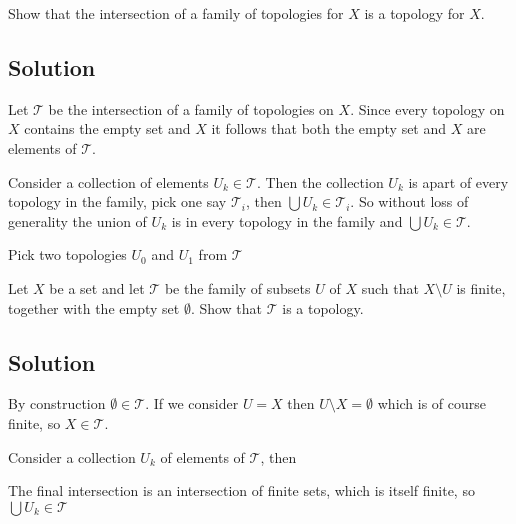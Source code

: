 
Show that the intersection of a family of topologies for $X$ is a topology for $X$.
\subsection*{Solution}
Let $\mathcal{T}$ be the intersection of a family of topologies on $X$. Since every topology on $X$ contains the empty set and $X$ it follows that both the empty set and $X$ are elements of $\mathcal{T}$.

Consider a collection of elements $U_k \in \mathcal{T}$. Then the collection $U_k$ is apart of every topology in the family, pick one say $\mathcal{T}_i$, then $\bigcup U_k \in \mathcal{T}_i$. So without loss of generality the union of $U_k$ is in every topology in the family and $\bigcup U_k \in \mathcal{T}$.

Pick two topologies $U_0$ and $U_1$ from $\mathcal{T}$

\pagebreak
{}
Let $X$ be a set and let $\mathcal{T}$ be the family of subsets $U$ of $X$ such that $X \setminus U$ is finite, together with the empty set $\emptyset$. Show that $\mathcal{T}$ is a topology.

\subsection*{Solution}
By construction $\emptyset \in \mathcal{T}$. If we consider $U = X$ then $U \setminus X = \emptyset$ which is of course finite, so $X \in \mathcal{T}$.

Consider a collection $U_k$ of elements of $\mathcal{T}$, then 

The final intersection is an intersection of finite sets, which is itself finite, so $\bigcup U_k \in \mathcal{T}$